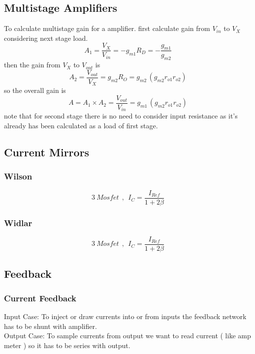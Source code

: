 \subsection{Multistage Amplifiers}
\begin{minipage}[b]{.7\textwidth}
\setlength{\abovedisplayshortskip}{15pt}
\setlength{\belowdisplayshortskip}{15pt} 
To calculate multistage gain for a amplifier. first calculate gain from $V_{in}$ to $V_X$ considering next stage load. 
$$ A_1 = \frac{V_X}{V_{in}} = -g_{m1} R_D = -\frac{g_{m1}}{g_{m2}} $$
then the gain from $V_X$ to $V_{out}$ is
$$ A_2 = \frac{V_{out}}{V_{X}} = g_{m2} R_{O} = {g_{m2}}\,({g_{m2} r_{o1} r _{o2}}) $$
so the overall gain is
$$ A = A_1 \times A_2 = \frac{V_{out}}{V_{in}} = {g_{m1}}\,({g_{m2} r_{o1} r _{o2}}) $$
note that for second stage there is no need to consider input resistance as it's already has been calculated as a load of first stage.
\end{minipage}%
\begin{minipage}{.3\textwidth}
\vspace{-25em}
\hspace{3em}

\end{minipage}%


\subsection{Current Mirrors}
\subsubsection{Wilson}
$$ 3~Mosfet ~~ , ~~ I_C = \frac{I_{Ref}}{1 + 2 \beta} $$
\par
\subsubsection{Widlar}
$$ 3~Mosfet ~~ , ~~ I_C = \frac{I_{Ref}}{1 + 2 \beta} $$
\par
\subsection{Feedback}
\subsubsection{Current Feedback}
Input Case: To inject or draw currents into or from inputs the feedback network has to be shunt with amplifier.\\
Output Case: To sample currents from output we want to read current ( like amp meter ) so it has to be series with output.\\
\lipsum[7-8]
